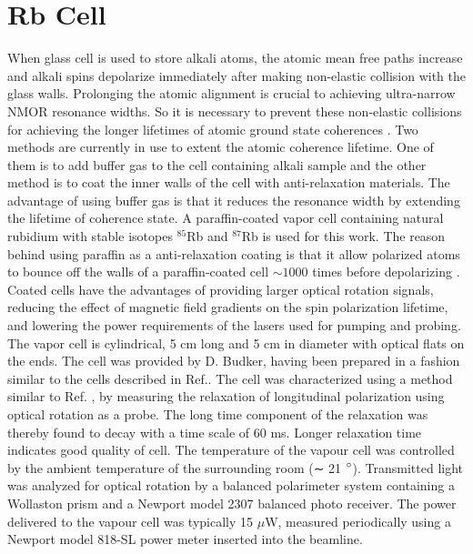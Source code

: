 \section{Rb Cell}
When glass cell is used to store alkali atoms, the atomic mean free paths increase and alkali spins depolarize immediately after making non-elastic collision with the glass walls. Prolonging the atomic alignment is crucial to achieving ultra-narrow NMOR resonance widths. So it is necessary to prevent these non-elastic collisions for achieving the longer lifetimes of atomic ground state coherences \cite{PhysRevA.72.023401}\cite{Balabas:10}  \cite{doi:10.1063/1.3236649}. Two methods are currently in use to extent the atomic coherence lifetime. One of them is to add buffer gas to the cell containing alkali sample and the other method is to coat the inner walls of the cell with anti-relaxation materials. The advantage of using buffer gas is that it reduces the resonance width by extending the lifetime of coherence state. A paraffin-coated vapor cell containing  natural rubidium with stable isotopes $^{85}$Rb and $^{87}$Rb is used for this work. The reason behind using paraffin as a anti-relaxation coating is that it allow polarized atoms to bounce off the walls of a paraffin-coated cell $\sim 1000$ times before depolarizing \cite{PhysRev.147.41} \cite{PhysRevA.72.023401}. Coated cells have the advantages of providing larger optical rotation
signals, reducing the effect of magnetic field gradients on the spin polarization lifetime,
and lowering the power requirements of the lasers used for pumping and probing. The vapor cell is cylindrical, 5 cm long and 5 cm in diameter with optical
flats on the ends. The cell was provided by D. Budker, having been prepared in
a fashion similar to the cells described in Ref.\cite{PhysRevA.72.023401}. The cell was characterized
using a method similar to Ref. \cite{PhysRevA.72.023401}, by measuring the relaxation of longitudinal
polarization using optical rotation as a probe. The long time component of the relaxation was thereby found to decay with a time scale of 60 ms.  Longer relaxation time indicates good quality of cell. The temperature of the vapour cell was controlled by the ambient temperature of the surrounding room (∼ 21 $\degree$). Transmitted light was analyzed for optical rotation by a balanced polarimeter system containing a Wollaston prism and a Newport model 2307 balanced photo receiver. The power delivered to the vapour cell was typically 15 $\mu$W, measured periodically using a Newport model 818-SL power meter inserted into the
beamline. 
